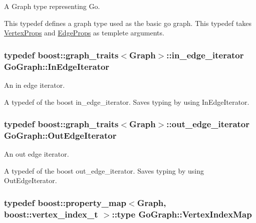 A Graph type representing Go. 

This typedef defines a graph type used as the basic go graph. This typedef takes \hyperlink{structGoGraph_1_1VertexProps}{Vertex\+Props} and \hyperlink{structGoGraph_1_1EdgeProps}{Edge\+Props} as templete arguments. 
\subsubsection[{\texorpdfstring{In\+Edge\+Iterator}{InEdgeIterator}}]{\setlength{\rightskip}{0pt plus 5cm}typedef boost\+::graph\+\_\+traits$<${\bf Graph}$>$\+::in\+\_\+edge\+\_\+iterator {\bf Go\+Graph\+::\+In\+Edge\+Iterator}}\hypertarget{classGoGraph_a749886e553031dcb52c595989129514d}{}\label{classGoGraph_a749886e553031dcb52c595989129514d}


An in edge iterator. 

A typedef of the boost in\+\_\+edge\+\_\+iterator. Saves typing by using In\+Edge\+Iterator. 
\subsubsection[{\texorpdfstring{Out\+Edge\+Iterator}{OutEdgeIterator}}]{\setlength{\rightskip}{0pt plus 5cm}typedef boost\+::graph\+\_\+traits$<${\bf Graph}$>$\+::out\+\_\+edge\+\_\+iterator {\bf Go\+Graph\+::\+Out\+Edge\+Iterator}}\hypertarget{classGoGraph_a40291cfa00013cbb9cfb400c1fc92379}{}\label{classGoGraph_a40291cfa00013cbb9cfb400c1fc92379}


An out edge iterator. 

A typedef of the boost out\+\_\+edge\+\_\+iterator. Saves typing by using Out\+Edge\+Iterator. 
\subsubsection[{\texorpdfstring{Vertex\+Index\+Map}{VertexIndexMap}}]{\setlength{\rightskip}{0pt plus 5cm}typedef boost\+::property\+\_\+map$<${\bf Graph}, boost\+::vertex\+\_\+index\+\_\+t $>$\+::type {\bf Go\+Graph\+::\+Vertex\+Index\+Map}}\hypertarget{classGoGraph_a8a262d8dedc41830e5d4208d4d5e76c3}{}\label{classGoGraph_a8a262d8dedc41830e5d4208d4d5e76c3}


